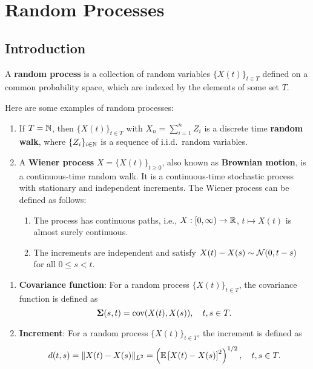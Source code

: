 \chapter{Random Processes}

\section{Introduction}

\begin{definition}
    A \textbf{random process} is a collection of random variables \(\{X(t)\}_{t\in T}\) defined on a common probability space, which are indexed by the elements of some set \(T\).
\end{definition}

\begin{example}
    Here are some examples of random processes:
    \begin{enumerate}
        \item If \(T={\mathbb N}\), then \(\{X(t)\}_{t\in T}\) with \(X_{n}=\sum_{i=1}^{n}Z_{i}\) is a discrete time \textbf{random walk}, where \(\{Z_{i}\}_{i\in{\mathbb N}}\) is a sequence of i.i.d.\ random variables.
        \item A \textbf{Wiener process} \(X=\{X(t)\}_{t\geq 0}\), also known as \textbf{Brownian motion}, is a continuous-time random walk. It is a continuous-time stochastic process with stationary and independent increments. The Wiener process can be defined as follows:
            \begin{enumerate}
            \item The process has continuous paths, i.e., \(X:[0,\infty)\to{\mathbb R}\), \(t\mapsto X(t)\) is almost surely continuous.
            \item The increments are independent and satisfy \(X(t)-X(s)\sim{\mathcal N}(0,t-s)\) for all \(0\leq s<t\).
        \end{enumerate}
    \end{enumerate}
\end{example}

\begin{definition}
\begin{enumerate}
    \item \textbf{Covariance function}: For a random process \(\{X(t)\}_{t\in T}\), the covariance function is defined as
        \begin{equation}
            \boldsymbol{\Sigma}(s,t)=\operatorname{cov}(X(t),X(s)),\quad t,s\in T.
        \end{equation}
    \item \textbf{Increment}: For a random process \(\{X(t)\}_{t\in T}\), the increment is defined as
        \begin{equation}
            d(t,s)=\|X(t)-X(s)\|_{L^{2}}=\left({\mathbb E}\left[X(t)-X(s)\right]^{2}\right)^{1/2},\quad t,s\in T.
        \end{equation}
\end{enumerate}
\end{definition}

